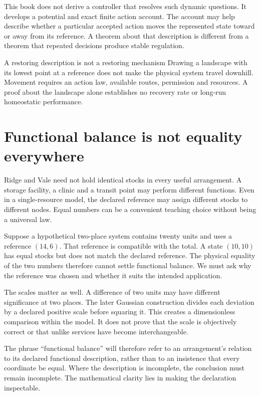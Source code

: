 This book does not derive a controller that resolves such dynamic questions. It develops a potential and exact finite action account. The account may help describe whether a particular accepted action moves the represented state toward or away from its reference. A theorem about that description is different from a theorem that repeated decisions produce stable regulation.

\begin{cautionbox}{A restoring description is not a restoring mechanism}
Drawing a landscape with its lowest point at a reference does not make the physical system travel downhill. Movement requires an action law, available routes, permission and resources. A proof about the landscape alone establishes no recovery rate or long-run homeostatic performance.
\end{cautionbox}

\section{Functional balance is not equality everywhere}
Ridge and Vale need not hold identical stocks in every useful arrangement. A storage facility, a clinic and a transit point may perform different functions. Even in a single-resource model, the declared reference may assign different stocks to different nodes. Equal numbers can be a convenient teaching choice without being a universal law.

Suppose a hypothetical two-place system contains twenty units and uses a reference $(14,6)$. That reference is compatible with the total. A state $(10,10)$ has equal stocks but does not match the declared reference. The physical equality of the two numbers therefore cannot settle functional balance. We must ask why the reference was chosen and whether it suits the intended application.

The scales matter as well. A difference of two units may have different significance at two places. The later Gaussian construction divides each deviation by a declared positive scale before squaring it. This creates a dimensionless comparison within the model. It does not prove that the scale is objectively correct or that unlike services have become interchangeable.

The phrase ``functional balance'' will therefore refer to an arrangement's relation to its declared functional description, rather than to an insistence that every coordinate be equal. Where the description is incomplete, the conclusion must remain incomplete. The mathematical clarity lies in making the declaration inspectable.

